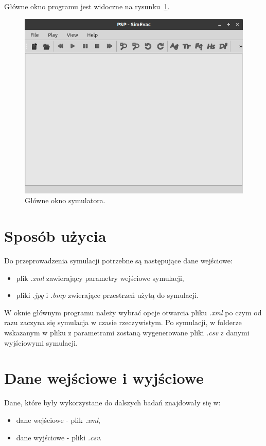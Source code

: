 \documentclass[12pt]{aghdpl}
\newenvironment{tightcenter}{
  \setlength\topsep{0pt}
  \setlength\parskip{0pt}
  \begin{center}
}{
  \end{center}
}
\begin{document}
		 Główne okno programu jest widoczne na rysunku~\ref{fig: glowne_okno_symulatora}.
	
		\begin{figure}[h]
	 		\begin{tightcenter}
	 			\includegraphics[width = 0.75\linewidth]{rysunki/symulator.png}
	 		\end{tightcenter}
	 		
			\caption{Główne okno symulatora.}
			\label{fig: glowne_okno_symulatora}
		\end{figure}
	
		\section{Sposób użycia}
		Do przeprowadzenia symulacji potrzebne są następujące dane wejściowe:
		\begin{itemize}
		\item plik \textit{.xml} zawierający parametry wejściowe symulacji,
		\item pliki \textit{.jpg} i \textit{.bmp} zwierające przestrzeń użytą do symulacji.
		\end{itemize}
	
		W oknie głównym programu należy wybrać opcje otwarcia pliku \textit{.xml} po czym od razu zaczyna się symulacja w czasie rzeczywistym. Po symulacji, w folderze wskazanym w pliku z parametrami zostaną wygenerowane pliki \textit{.csv} z danymi wyjściowymi symulacji.
		
		\section{Dane wejściowe i wyjściowe}
		Dane, które były wykorzystane do dalszych badań znajdowały się w:
		\begin{itemize}
		\item dane wejściowe - plik \textit{.xml},
		\item dane wyjściowe - pliki \textit{.csv}.
		\end{itemize}
		
\end{document}
